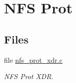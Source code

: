 \hypertarget{group__libfs__nfsclient__nfs__prot}{}\section{N\+FS Prot}
\label{group__libfs__nfsclient__nfs__prot}
\subsection*{Files}
\begin{DoxyCompactItemize}
\item 
file \mbox{\hyperlink{nfs__prot__xdr_8c}{nfs\+\_\+prot\+\_\+xdr.\+c}}
\begin{DoxyCompactList}\small\item\em N\+FS Prot X\+DR. \end{DoxyCompactList}\end{DoxyCompactItemize}
